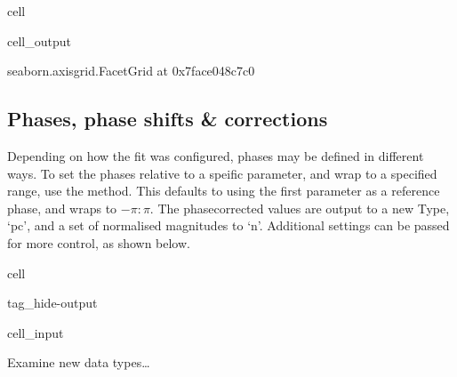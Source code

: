 \documentclass[letterpaper,table,10pt,english]{jupyterBook}
\begin{document}
\begin{sphinxuseclass}{cell}
\begin{sphinxVerbatimOutput}
\begin{sphinxuseclass}{cell_output}
\begin{sphinxVerbatim}[commandchars=\\\{\}]
\PYGZlt{}seaborn.axisgrid.FacetGrid at 0x7face048c7c0\PYGZgt{}
\end{sphinxVerbatim}

\noindent{}

\end{sphinxuseclass}\end{sphinxVerbatimOutput}

\end{sphinxuseclass}

\subsection{Phases, phase shifts \& corrections}
\label{\detokenize{part2/case-study-N2_290723:phases-phase-shifts-corrections}}
\sphinxAtStartPar
Depending on how the fit was configured, phases may be defined in different ways. To set the phases relative to a speific parameter, and wrap to a specified range, use the  method. This defaults to using the first parameter as a reference phase, and wraps to \(-\pi:\pi\). The phase\sphinxhyphen{}corrected values are output to a new Type, ‘pc’, and a set of normalised magnitudes to ‘n’. Additional settings can be passed for more control, as shown below.

\begin{sphinxuseclass}{cell}
\begin{sphinxuseclass}{tag_hide-output}\begin{sphinxVerbatimInput}

\begin{sphinxuseclass}{cell_input}
\begin{sphinxVerbatim}[commandchars=\\\{\}]
 
\end{sphinxVerbatim}

\end{sphinxuseclass}\end{sphinxVerbatimInput}

\end{sphinxuseclass}
\end{sphinxuseclass}
\sphinxAtStartPar
Examine new data types…
\end{document}
